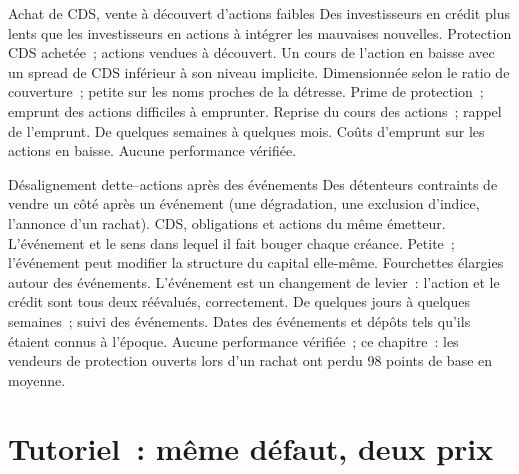 \begin{strategyfile}{Achat de CDS, vente à découvert d'actions faibles}\label{strat:s2:capital-structure-arbitrage:weak}
 Des investisseurs en crédit plus lents que les investisseurs en actions à intégrer les mauvaises nouvelles.
 Protection CDS achetée~; actions vendues à découvert.
 Un cours de l'action en baisse avec un spread de CDS inférieur à son niveau implicite.
 Dimensionnée selon le ratio de couverture~; petite sur les noms proches de la détresse.
 Prime de protection~; emprunt des actions difficiles à emprunter.
 Reprise du cours des actions~; rappel de l'emprunt.
 De quelques semaines à quelques mois.
 Coûts d'emprunt sur les actions en baisse.
 Aucune performance vérifiée.
\end{strategyfile}

\begin{strategyfile}{Désalignement dette--actions après des événements}\label{strat:s2:capital-structure-arbitrage:events}
 Des détenteurs contraints de vendre un côté après un événement (une dégradation, une exclusion d'indice, l'annonce d'un rachat).
 CDS, obligations et actions du même émetteur.
 L'événement et le sens dans lequel il fait bouger chaque créance.
 Petite~; l'événement peut modifier la structure du capital elle-même.
 Fourchettes élargies autour des événements.
 L'événement est un changement de levier~: l'action et le crédit sont tous deux réévalués, correctement.
 De quelques jours à quelques semaines~; suivi des événements.
 Dates des événements et dépôts tels qu'ils étaient connus à l'époque.
 Aucune performance vérifiée~; ce chapitre~: les vendeurs de protection ouverts lors d'un rachat ont perdu 98 points de base en moyenne.
\end{strategyfile}

\section{Tutoriel~: même défaut, deux prix}\label{tut:s2:capital-structure-arbitrage:tut}

